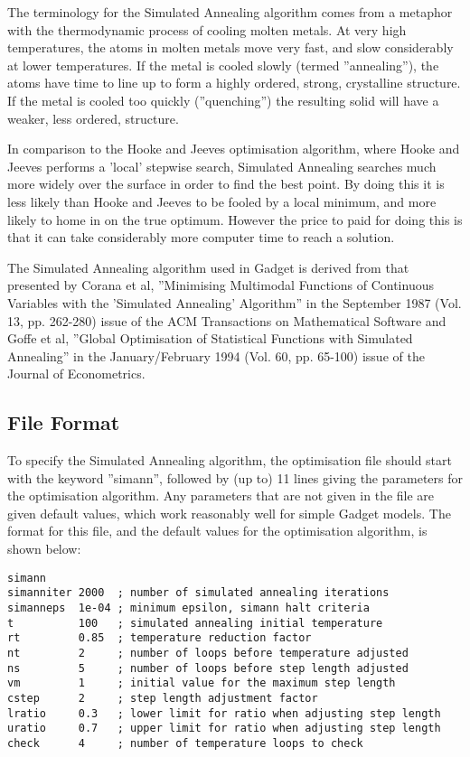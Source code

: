 \documentclass [a4paper, 10pt]{book}
\begin{document}
\bigskip
The terminology for the Simulated Annealing algorithm comes from a metaphor with the thermodynamic process of cooling molten metals.  At very high temperatures, the atoms in molten metals move very fast, and slow considerably at lower temperatures.  If the metal is cooled slowly (termed ''annealing''), the atoms have time to line up to form a highly ordered, strong, crystalline structure.  If the metal is cooled too quickly (''quenching'') the resulting solid will have a weaker, less ordered, structure.

\bigskip
In comparison to the Hooke and Jeeves optimisation algorithm, where Hooke and Jeeves performs a 'local' stepwise search, Simulated Annealing searches much more widely over the surface in order to find the best point.  By doing this it is less likely than Hooke and Jeeves to be fooled by a local minimum, and more likely to home in on the true optimum.  However the price to paid for doing this is that it can take considerably more computer time to reach a solution.

\bigskip
The Simulated Annealing algorithm used in Gadget is derived from that presented by Corana et al, ''Minimising Multimodal Functions of Continuous Variables with the 'Simulated Annealing' Algorithm'' in the September 1987 (Vol. 13, pp. 262-280) issue of the ACM Transactions on Mathematical Software and Goffe et al, ''Global Optimisation of Statistical Functions with Simulated Annealing'' in the January/February 1994 (Vol. 60, pp. 65-100) issue of the Journal of Econometrics.

\subsection{File Format}\label{subsec:simannfile}
To specify the Simulated Annealing algorithm, the optimisation file should start with the keyword ''simann'', followed by (up to) 11 lines giving the parameters for the optimisation algorithm.  Any parameters that are not given in the file are given default values, which work reasonably well for simple Gadget models.  The format for this file, and the default values for the optimisation algorithm, is shown below:

{\small\begin{verbatim}
simann
simanniter 2000  ; number of simulated annealing iterations
simanneps  1e-04 ; minimum epsilon, simann halt criteria
t          100   ; simulated annealing initial temperature
rt         0.85  ; temperature reduction factor
nt         2     ; number of loops before temperature adjusted
ns         5     ; number of loops before step length adjusted
vm         1     ; initial value for the maximum step length
cstep      2     ; step length adjustment factor
lratio     0.3   ; lower limit for ratio when adjusting step length
uratio     0.7   ; upper limit for ratio when adjusting step length
check      4     ; number of temperature loops to check
\end{verbatim}}
\end{document}
